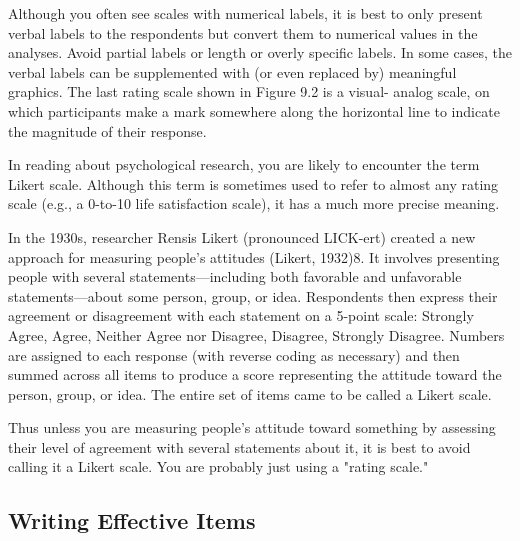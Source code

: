 Although you often see scales with numerical labels, it is best to only present verbal labels to the respondents but convert them to numerical values in the analyses. Avoid partial labels or length or overly specific labels. In some cases, the verbal labels can be supplemented with (or even replaced by) meaningful graphics. The last rating scale shown in Figure 9.2 is a visual- analog scale, on which participants make a mark somewhere along the horizontal line to indicate the magnitude of their response.


\color{fgcolor}\begin{kframe}



In reading about psychological research, you are likely to encounter the term Likert scale. Although this term is sometimes used to refer to almost any rating scale (e.g., a 0-to-10 life satisfaction scale), it has a much more precise meaning.


In the 1930s, researcher Rensis Likert (pronounced LICK-ert) created a new approach for measuring people’s attitudes (Likert, 1932)8. It involves presenting people with several statements---including both favorable and unfavorable statements---about some person, group, or idea. Respondents then express their agreement or disagreement with each statement on a 5-point scale: Strongly Agree, Agree, Neither Agree nor Disagree, Disagree, Strongly Disagree. Numbers are assigned to each response (with reverse coding as necessary) and then summed across all items to produce a score representing the attitude toward the person, group, or idea. The entire set of items came to be called a Likert scale.


Thus unless you are measuring people’s attitude toward something by assessing their level of agreement with several statements about it, it is best to avoid calling it a Likert scale. You are probably just using a "rating scale."

\end{kframe}



\subsection{Writing Effective Items}


